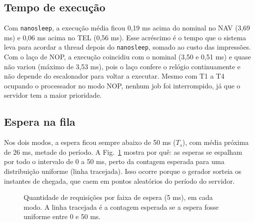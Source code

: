 \documentclass[conference,a4paper]{IEEEtran}
\begin{document}
\subsection{Tempo de execução}
Com \texttt{nanosleep}, a execução média ficou 0,19 ms acima do nominal no NAV (3,69 ms) e 0,06 ms acima no TEL (0,56 ms). Esse acréscimo é o tempo que o sistema leva para acordar a thread depois do \texttt{nanosleep}, somado ao custo das impressões. Com o laço de NOP, a execução coincidiu com o nominal (3,50 e 0,51 ms) e quase não variou (máximo de 3,53 ms), pois o laço confere o relógio continuamente e não depende do escalonador para voltar a executar. Mesmo com T1 a T4 ocupando o processador no modo NOP, nenhum job foi interrompido, já que o servidor tem a maior prioridade.

\subsection{Espera na fila}
Nos dois modos, a espera ficou sempre abaixo de 50 ms ($T_s$), com média próxima de 26 ms, metade do período. A Fig.~\ref{fig:hist} mostra por quê: as esperas se espalham por todo o intervalo de 0 a 50 ms, perto da contagem esperada para uma distribuição uniforme (linha tracejada). Isso ocorre porque o gerador sorteia os instantes de chegada, que caem em pontos aleatórios do período do servidor.

\begin{figure}[!t]
\centering
{}
\caption{Quantidade de requisições por faixa de espera (5 ms), em cada modo. A linha tracejada é a contagem esperada se a espera fosse uniforme entre 0 e 50 ms.}
\label{fig:hist}
\end{figure}
\end{document}
